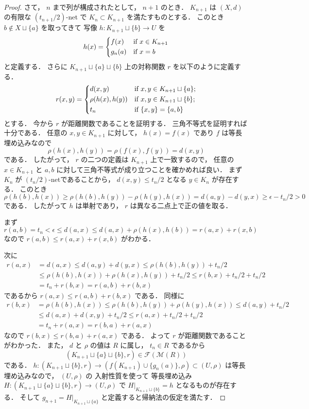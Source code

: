 \documentclass[leqno, 12pt]{jsarticle}
\newcommand{\Met}[1]{\mathscr{M}(#1)}
\newcommand{\FinitePart}[1]{\mathscr{F}(#1)}
\newcommand{\FinMet}[1]{\FinitePart{\Met{#1}}}
\newcommand{\restr}[2]{#1|_{#2}}
\begin{document}
\begin{proof}
さて，
$n$
まで列が構成されたとして，
$n+1$
のとき．
$K_{n+1}$
は
$(X, d)$%
の有限な
$(t_{n+1}/2)$-net
で
$K_{n}\subset K_{n+1}$
を満たすものとする．
このとき
$b\not\in X\sqcup\{a\}$
を取ってきて
写像%
$h\colon  K_{n+1}\sqcup\{b\}\to U$%
を
\[
h(x)=
\begin{dcases}
f(x) & \text{if
$x\in K_{n+1}$%
}\\
g_{n}(a) & \text{if
$x=b$%
}
\end{dcases}
\]
と定義する．
さらに
$K_{n+1}\sqcup\{a\}\sqcup\{b\}$
上の対称関数
$r$
を以下のように定義する．
\[
r(x, y)=
\begin{dcases}
	d(x, y) & \text{if
$x, y\in K_{n+1}\sqcup\{a\}$;%
}\\
	\rho(h(x), h(y)) & \text{if
$x, y\in K_{n+1}\sqcup\{b\}$;%
}\\
		t_n & \text{if $\{x, y\}=\{a, b\}$}
\end{dcases}
\]
とする．
今から
$r$
が距離関数であることを証明する．
三角不等式を証明すれば十分である．
任意の
$x,y\in K_{n+1}$
に対して，
$h(x)=f(x)$
であり
$f$
は等長埋め込みなので
\[
\rho(h(x),h(y))
=\rho(f(x),f(y))
=d(x,y)
\]
である．
したがって，
$r$
の二つの定義は
$K_{n+1}$
上で一致するので，
任意の
$x\in K_{n+1}$
と
$a, b$
に対して三角不等式が成り立つことを確かめれば良い．
まず
$K_n$
が
$(t_n/2)$-netであることから，
$d(x,y)\le t_n/2$
となる
$y\in K_n$
が存在する．
このとき
\[
\rho(h(b),h(x))
\geq
\rho(h(b),h(y))-\rho(h(y),h(x))
=d(a,y)-d(y,x)
\geq\epsilon-t_n/2>0
\]
である．
したがって
$h$
は単射であり，
$r$
は異なる二点上で正の値を取る．

まず
\[
r(a, b)=t_n<\epsilon  \le d(a, x)\le d(a, x)+\rho(h(x), h(b))
=r(a, x)+r(x, b)
\]
なので
$r(a, b)\le r(a, x)+r(x, b)$
がわかる．

次に
\begin{align*}
r(a, x)&=d(a, x)\le d(a, y)+d(y, x)
\le \rho(h(b), h(y))+ t_n/2\\
&\le \rho(h(b), h(x))+\rho(h(x), h(y)) + t_n/2
\le r(b, x)+t_n/2+t_n/2\\
&=t_n+r(b, x)=r(a, b)+r(b, x)
\end{align*}
であるから
$r(a, x)\le r(a, b)+r(b, x)$%
である．
同様に
\begin{align*}
r(b, x)&=\rho(h(b), h(x))\le \rho(h(b), h(y))+\rho(h(y), h(x))\le
d(a, y)+ t_n/2\\
&\le  d(a, x)+d(x, y)+t_n/2
\le r(a, x) +t_n/2+t_n/2\\
&= t_n+r(a, x)=r(b, a)+r(a, x)
\end{align*}
なので
$r(b, x)\le r(b, a)+r(a, x)$
である．
よって%
$r$%
が距離関数であることがわかった．
また，
$d$
と
$\rho$
の値は
$R$
に属し，
$t_n\in R$
であるから
\[
(K_{n+1}\sqcup\{a\}\sqcup\{b\},r)
\in\FinMet{R}
\]
である．
$h\colon  (K_{n+1}\sqcup\{b\}, r)\to
(f(K_{n+1})\cup \{g_{n}(a)\}, \rho)\subset (U, \rho)$
は等長埋め込みなので，
$(U, \rho)$
の
入射性質を使って
等長埋め込み
$H\colon  (K_{n+1}\sqcup\{a\}\sqcup\{b\}, r)\to (U, \rho)$
で
$\restr{H}{K_{n+1}\sqcup\{b\}}=h$
となるものが存在する．
そして
$g_{n+1}=\restr{H}{K_{n+1}\sqcup\{a\}}$
と定義すると帰納法の仮定を満たす．


\end{proof}
\end{document}
